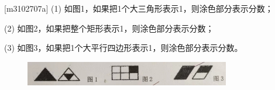 [m3102707a]\quad
(1) 如图1，如果把1个大三角形表示1，则涂色部分表示分数；\par
(2) 如图2，如果把整个矩形表示1，则涂色部分表示分数；\par
(3) 如图3，如果把1个大平行四边形表示1，则涂色部分表示分数。
\par
\begin{figure}[H]
    \centering
    \includegraphics[width=0.8\textwidth,keepaspectratio]{m3102707ab}
\end{figure}